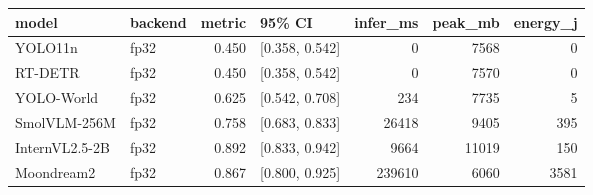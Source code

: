 \begin{tabular}{llrlrrr}
\toprule
model & backend & metric & 95\% CI & infer\_ms & peak\_mb & energy\_j \\
\midrule
YOLO11n & fp32 & 0.450 & [0.358, 0.542] & 0 & 7568 & 0 \\
RT-DETR & fp32 & 0.450 & [0.358, 0.542] & 0 & 7570 & 0 \\
YOLO-World & fp32 & 0.625 & [0.542, 0.708] & 234 & 7735 & 5 \\
SmolVLM-256M & fp32 & 0.758 & [0.683, 0.833] & 26418 & 9405 & 395 \\
InternVL2.5-2B & fp32 & 0.892 & [0.833, 0.942] & 9664 & 11019 & 150 \\
Moondream2 & fp32 & 0.867 & [0.800, 0.925] & 239610 & 6060 & 3581 \\
\bottomrule
\end{tabular}